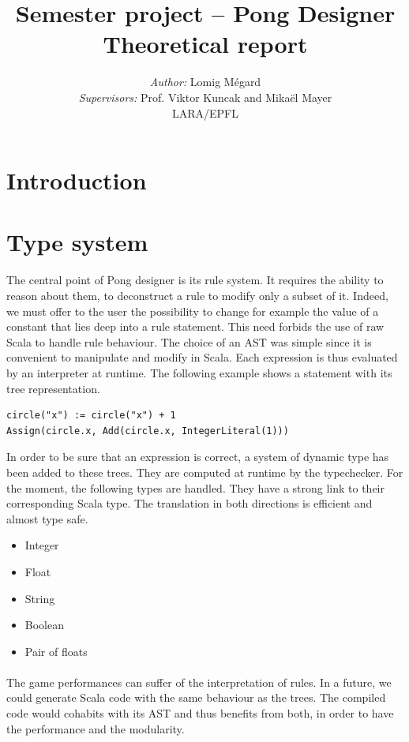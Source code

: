\documentclass[11pt,a4paper]{article}
\title{Semester project -- Pong Designer\\Theoretical report}
\author{\textit{Author:} Lomig Mégard\\
\textit{Supervisors:} Prof. Viktor Kuncak and Mikaël Mayer\vspace*{0.5cm}\\
\textsc{LARA/EPFL}}
\begin{document}
\maketitle

\section{Introduction}


\section{Type system}
The central point of Pong designer is its rule system. It requires the ability to reason about them, to deconstruct a rule to modify only a subset of it. Indeed, we must offer to the user the possibility to change for example the value of a constant that lies deep into a rule statement. This need forbids the use of raw Scala to handle rule behaviour. The choice of an AST was simple since it is convenient to manipulate and modify in Scala. Each expression is thus evaluated by an interpreter at runtime. The following example shows a statement with its tree representation.
\begin{lstlisting}
circle("x") := circle("x") + 1
Assign(circle.x, Add(circle.x, IntegerLiteral(1)))
\end{lstlisting}

In order to be sure that an expression is correct, a system of dynamic type has been added to these trees. They are computed at runtime by the typechecker. For the moment, the following types are handled. They have a strong link to their corresponding Scala type. The translation in both directions is efficient and almost type safe.
\begin{itemize}[noitemsep,topsep=2pt,parsep=1pt,partopsep=1pt]
\item Integer
\item Float
\item String
\item Boolean
\item Pair of floats
\end{itemize}

\paragraph*{}
The game performances can suffer of the interpretation of rules. In a future, we could generate Scala code with the same behaviour as the trees. The compiled code would cohabits with its AST and thus benefits from both, in order to have the performance and the modularity.
\end{document}
